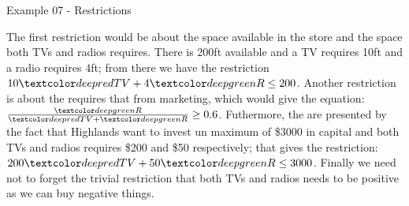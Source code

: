 \begin{frame}{Example 07 - Restrictions}

The first restriction would be about the space available in the store and the
space both TVs and radios requires. There is 200ft available and
a TV requires 10ft and a radio requires 4ft; from
there we have the restriction $10\colora{TV} + 4\colorb{R} \le 200$. Another
restriction is about the requires that from marketing, which would give the
equation: $\frac{\colorb{R}}{\colora{TV} + \colorb{R}} \ge 0.6$. Futhermore,
the are presented by the fact that Highlands want to invest un maximum of \$3000
in capital and both TVs and radios requires \$200 and \$50 respectively; that
gives the restriction: $200\colora{TV} + 50\colorb{R} \le 3000$. Finally we
need not to forget the trivial restriction that both TVs and radios needs to be
positive as we can buy negative things.

\end{frame}
